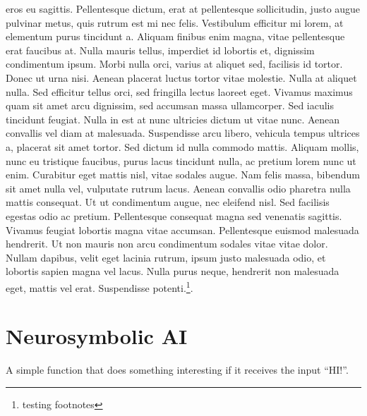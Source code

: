 \documentclass[
  a4paper,
  DIV=11,
  numbers=noendperiod]{scrreprt}
\begin{document}
eros eu sagittis. Pellentesque dictum, erat at pellentesque
sollicitudin, justo augue pulvinar metus, quis rutrum est mi nec felis.
Vestibulum efficitur mi lorem, at elementum purus tincidunt a. Aliquam
finibus enim magna, vitae pellentesque erat faucibus at. Nulla mauris
tellus, imperdiet id lobortis et, dignissim condimentum ipsum. Morbi
nulla orci, varius at aliquet sed, facilisis id tortor. Donec ut urna
nisi. Aenean placerat luctus tortor vitae molestie. Nulla at aliquet
nulla. Sed efficitur tellus orci, sed fringilla lectus laoreet eget.
Vivamus maximus quam sit amet arcu dignissim, sed accumsan massa
ullamcorper. Sed iaculis tincidunt feugiat. Nulla in est at nunc
ultricies dictum ut vitae nunc. Aenean convallis vel diam at malesuada.
Suspendisse arcu libero, vehicula tempus ultrices a, placerat sit amet
tortor. Sed dictum id nulla commodo mattis. Aliquam mollis, nunc eu
tristique faucibus, purus lacus tincidunt nulla, ac pretium lorem nunc
ut enim. Curabitur eget mattis nisl, vitae sodales augue. Nam felis
massa, bibendum sit amet nulla vel, vulputate rutrum lacus. Aenean
convallis odio pharetra nulla mattis consequat. Ut ut condimentum augue,
nec eleifend nisl. Sed facilisis egestas odio ac pretium. Pellentesque
consequat magna sed venenatis sagittis. Vivamus feugiat lobortis magna
vitae accumsan. Pellentesque euismod malesuada hendrerit. Ut non mauris
non arcu condimentum sodales vitae vitae dolor. Nullam dapibus, velit
eget lacinia rutrum, ipsum justo malesuada odio, et lobortis sapien
magna vel lacus. Nulla purus neque, hendrerit non malesuada eget, mattis
vel erat. Suspendisse potenti.\footnote{testing footnotes}.

\section{Neurosymbolic AI}\label{neurosymbolic-ai}

\begin{codelisting}

\caption{\label{lst-test}A simple function that does something
interesting if it receives the input ``HI!''.}


\end{codelisting}%
\end{document}
